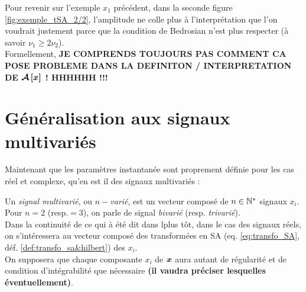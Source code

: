 Pour revenir sur l'exemple $x_1$ précédent, dans la seconde figure \ref{fig:exemple_tSA_2/2}, l'amplitude ne colle plus à l'interprétation que l'on voudrait justement parce que la condition de Bedrosian n'est plus respecter (à savoir $\nu_1\geq 2\nu_2$). 
\\
Formellement, \textbf{JE COMPRENDS TOUJOURS PAS COMMENT CA POSE PROBLEME DANS LA DEFINITON / INTERPRETATION DE $\bf{\SA{x}}$ ! HHHHHH !!!}
\\



\section{Généralisation aux signaux multivariés}\label{sec:sign_multivar}

Maintenant que les paramètres instantanée sont proprement définie pour les cas réel et complexe, qu'en est il des signaux multivariés :

\begin{definition}\label{def:signal_multivar}
	Un \emph{signal multivarié}, ou \emph{$n-$varié}, est un vecteur composé de $n\in\N^*$ signaux $x_i$. Pour $n=2$ (resp.$=3$), on parle de signal \emph{bivarié} (resp. \emph{trivarié}).
	\\
	Dans la continuité de ce qui à été dit dans lplus tôt, dans le cas des signaux réels, on s'intéressera au vecteur composé des transformées en SA (eq. \eqref{eq:transfo_SA}, déf. \ref{def:transfo_sa&hilbert}) des $x_i$.
	\\
	On supposera que chaque composante $x_i$ de $\bf{x}$ aura autant de régularité et de condition d'intégrabilité que nécessaire \textbf{(il vaudra préciser lesquelles éventuellement)}.
\end{definition}

